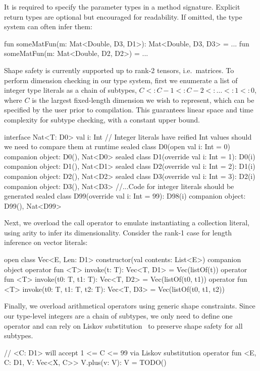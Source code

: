 \documentclass[12pt,initial,twoside,maitrise]{dms}
\numberwithin{equation}{section}
\numberwithin{table}{chapter}
\numberwithin{figure}{chapter}
\begin{document}
%
It is required to specify the parameter types in a method signature. Explicit return types are optional but encouraged for readability. If omitted, the type system can often infer them:
%
\begin{kotlinlisting}
fun someMatFun(m: Mat<Double, D3, D1>): Mat<Double, D3, D3> = ...
fun someMatFun(m: Mat<Double, D2, D2>) = ...
\end{kotlinlisting}
%
Shape safety is currently supported up to rank-2 tensors, i.e.\ matrices. To perform dimension checking in our type system, first we enumerate a list of integer type literals as a chain of subtypes, $C <: C - 1 <: C - 2 <: \dots <: 1 <: 0$, where $C$ is the largest fixed-length dimension we wish to represent, which can be specified by the user prior to compilation. This guarantees linear space and time complexity for subtype checking, with a constant upper bound.
%
\begin{kotlinlisting}[caption={Shape safe tensor addition for rank-1 tensors, $\forall C\leq2.$}]
interface Nat<T: D0> { val i: Int }
// Integer literals have reified Int values should we need to compare them at runtime
sealed class D0(open val i: Int = 0) { companion object: D0(), Nat<D0> }
sealed class D1(override val i: Int = 1): D0(i) { companion object: D1(), Nat<D1> }
sealed class D2(override val i: Int = 2): D1(i) { companion object: D2(), Nat<D2> }
sealed class D3(override val i: Int = 3): D2(i) { companion object: D3(), Nat<D3> }
//...Code for integer literals should be generated
sealed class D99(override val i: Int = 99): D98(i) { companion object: D99(), Nat<D99> }
\end{kotlinlisting}
%
Next, we overload the call operator to emulate instantiating a collection literal, using arity to infer its dimensionality. Consider the rank-1 case for length inference on vector literals:
%
\begin{kotlinlisting}
open class Vec<E, Len: D1> constructor(val contents: List<E>) {
    companion object {
        operator fun <T> invoke(t: T): Vec<T, D1> = Vec(listOf(t))
        operator fun <T> invoke(t0: T, t1: T): Vec<T, D2> = Vec(listOf(t0, t1))
        operator fun <T> invoke(t0: T, t1: T, t2: T): Vec<T, D3> = Vec(listOf(t0, t1, t2))
    }
}
\end{kotlinlisting}
%
Finally, we overload arithmetical operators using generic shape constraints. Since our type-level integers are a chain of subtypes, we only need to define one operator and can rely on Liskov substitution~\citep{liskov1987} to preserve shape safety for all subtypes.
%
\begin{kotlinlisting}
// <C: D1> will accept 1 <= C <= 99 via Liskov substitution
operator fun <E, C: D1, V: Vec<X, C>> V.plus(v: V): V = TODO()
\end{kotlinlisting}
\end{document}
